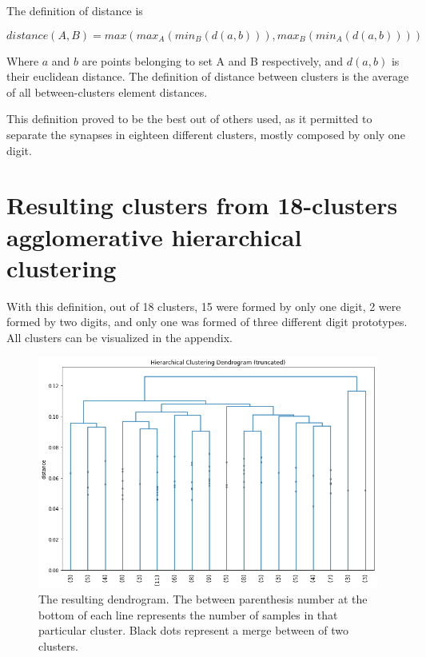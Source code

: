 \documentclass[a4paper]{report}
\begin{document}
The definition of distance is

\begin{equation}
    distance(A, B) = max(max_A(min_B(d(a,b))), max_B(min_A(d(a,b))))
\end{equation}

Where $a$ and $b$ are points belonging to set A and B respectively, and $d(a,b)$ is their euclidean distance. The definition of distance between clusters is the average of all between-clusters element distances.

This definition proved to be the best out of others used, as it permitted to separate the synapses in eighteen different clusters, mostly composed by only one digit.



\section{Resulting clusters from 18-clusters agglomerative hierarchical clustering}

With this definition, out of 18 clusters, 15 were formed by only one digit, 2 were formed by two digits, and only one was formed of three different digit prototypes. All clusters can be visualized in the appendix.

\begin{figure} [H]
    \centering
    \includegraphics [width=\textwidth]{o/clustering.png}
    \caption{The resulting dendrogram. The between parenthesis number at the bottom of each line represents the number of samples in that particular cluster. Black dots represent a merge between of two clusters.}
    \label{clustering}
\end{figure}
\end{document}

